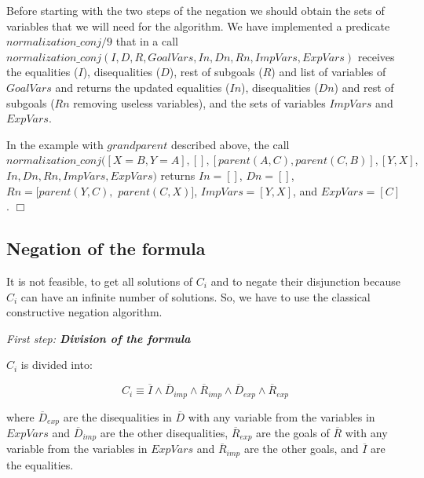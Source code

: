 \documentclass{tlp}
\newcommand{\implementation}[1]{\noindent{\sc Implementation details:}
  #1 $\Box$}
\begin{document}
\begin{itemize}
\begin{itemize}
    \end{itemize}

\implementation{
Before starting with the two steps of the
negation we should obtain the sets of variables that we will need for the
algorithm. We have implemented a predicate $normalization\_conj/9$ that in a
call  \linebreak
$normalization\_conj(I,D,R,GoalVars,In,Dn,Rn,ImpVars,ExpVars)$ receives
the equalities ($I$), disequalities ($D$), rest of subgoals ($R$) and list of variables of
$GoalVars$ and returns the updated equalities ($In$), disequalities ($Dn$) and rest of
subgoals ($Rn$ removing useless variables), and the sets of variables $ImpVars$ and
$ExpVars$.

In the example with $grandparent$ described above, the call \\
$normalization\_conj([X=B,Y=A], [], [parent(A,C),parent(C,B)], [Y,X],$ $ In, Dn,
Rn, ImpVars, ExpVars)$ 
returns $In=[]$, $Dn=[]$, $Rn=[parent(Y,C),$ $parent(C,X)]$, $ImpVars=[Y,X]$, and
$ExpVars=[C]$.
}
 \end{itemize}  
 


\subsection{Negation of the formula}
\label{negation}

It is not feasible, to get all solutions of $C_i$ and to negate their
disjunction because $C_i$ can have an infinite number of solutions. So,
we have to use the classical constructive negation algorithm.

\medskip

\noindent
{\em First step: {\bf Division of the formula}}

\noindent
$C_i$ is divided into: 

\[~C_i \equiv \overline{I} \wedge
        \overline{D}_{imp} \wedge \overline{R}_{imp} \wedge
        \overline{D}_{exp} \wedge \overline{R}_{exp} \]

\noindent
where $\overline{D}_{exp}$ are the disequalities in $\overline{D}$
with any variable from the variables in $ExpVars$ and $\overline{D}_{imp}$ are the other
disequalities, $\overline{R}_{exp}$ are the goals of $\overline{R}$
with any variable from the variables in $ExpVars$ and $\overline{R}_{imp}$ are the other
goals, and $\overline{I}$ are the equalities.
\end{document}
